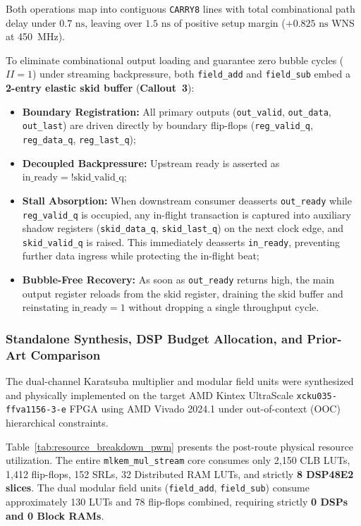 Both operations map into contiguous \texttt{CARRY8} lines with total combinational path delay under $0.7\text{ ns}$, leaving over $1.5\text{ ns}$ of positive setup margin ($+0.825\text{ ns}$ WNS at 450~MHz).

To eliminate combinational output loading and guarantee zero bubble cycles ($II = 1$) under streaming backpressure, both \texttt{field\_add} and \texttt{field\_sub} embed a \textbf{2-entry elastic skid buffer} (\textbf{Callout~3}):
\begin{itemize}
    \item \textbf{Boundary Registration:} All primary outputs (\texttt{out\_valid}, \texttt{out\_data}, \texttt{out\_last}) are driven directly by boundary flip-flops (\texttt{reg\_valid\_q}, \texttt{reg\_data\_q}, \texttt{reg\_last\_q});
    \item \textbf{Decoupled Backpressure:} Upstream ready is asserted as $\text{in\_ready} = !\text{skid\_valid\_q}$;
    \item \textbf{Stall Absorption:} When downstream consumer deasserts \texttt{out\_ready} while \texttt{reg\_valid\_q} is occupied, any in-flight transaction is captured into auxiliary shadow registers (\texttt{skid\_data\_q}, \texttt{skid\_last\_q}) on the next clock edge, and \texttt{skid\_valid\_q} is raised. This immediately deasserts \texttt{in\_ready}, preventing further data ingress while protecting the in-flight beat;
    \item \textbf{Bubble-Free Recovery:} As soon as \texttt{out\_ready} returns high, the main output register reloads from the skid register, draining the skid buffer and reinstating $\text{in\_ready} = 1$ without dropping a single throughput cycle.
\end{itemize}

\subsubsection{Standalone Synthesis, DSP Budget Allocation, and Prior-Art Comparison}
\label{sec05b_results_comparison}

The dual-channel Karatsuba multiplier and modular field units were synthesized and physically implemented on the target AMD Kintex UltraScale \texttt{xcku035-ffva1156-3-e} FPGA using AMD Vivado 2024.1 under out-of-context (OOC) hierarchical constraints.

Table~\ref{tab:resource_breakdown_pwm} presents the post-route physical resource utilization. The entire \texttt{mlkem\_mul\_stream} core consumes only 2,150 CLB LUTs, 1,412 flip-flops, 152 SRLs, 32 Distributed RAM LUTs, and strictly \textbf{8 DSP48E2 slices}. The dual modular field units (\texttt{field\_add}, \texttt{field\_sub}) consume approximately 130 LUTs and 78 flip-flops combined, requiring strictly \textbf{0 DSPs and 0 Block RAMs}.

